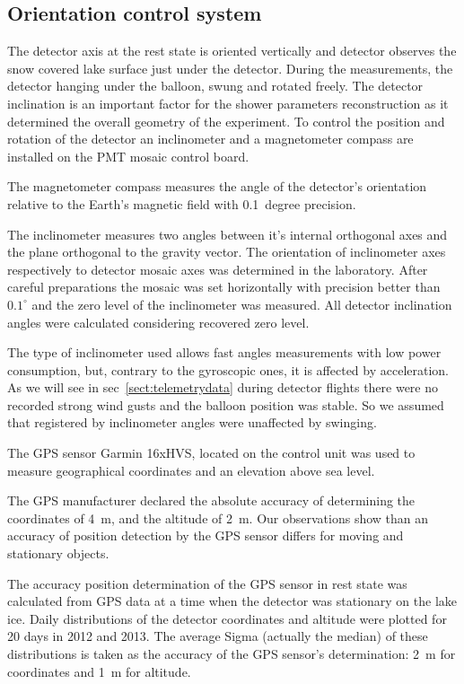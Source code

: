 \documentclass[final,5p,times,twocolumn]{elsarticle}
\begin{document}
\subsection{Orientation control system}
\label{sect:orientation}

The detector axis at the rest state is oriented vertically and detector observes the snow covered lake surface just under the detector. During the measurements, the detector hanging under the balloon, swung and rotated freely. The detector inclination is an important factor for the shower parameters reconstruction as it determined the overall geometry of the experiment. To control the position and rotation of the detector an inclinometer and a magnetometer compass are installed on the PMT mosaic control board. 

The magnetometer compass measures the angle of the detector's orientation relative to the Earth's magnetic field with 0.1~degree precision.

The inclinometer measures two angles between it's internal orthogonal axes and the plane orthogonal to the gravity vector. The orientation of inclinometer axes respectively to detector mosaic axes was determined in the laboratory. After careful preparations the mosaic was set horizontally with precision better than $0.1^\circ$ and the zero level of the inclinometer was measured. All detector inclination angles were calculated considering recovered zero level.

The type of inclinometer used allows fast angles measurements with low power consumption, but, contrary to the gyroscopic ones, it is affected by acceleration. As we will see in sec~\ref{sect:telemetrydata} during detector flights there were no recorded strong wind gusts and the balloon position was stable. So we assumed that  registered by inclinometer angles were unaffected by swinging.

The GPS sensor Garmin 16xHVS, located on the control unit was used to measure geographical coordinates and an elevation above sea level. 

The GPS manufacturer declared the absolute accuracy of determining the coordinates of 4~m, and the altitude of 2~m. Our observations show than an accuracy of position detection by the GPS sensor differs for moving and stationary objects. 

The accuracy position determination of the GPS sensor in rest state was calculated from GPS data at a time when the detector was stationary on the lake ice. Daily distributions of the detector coordinates and altitude were plotted for 20 days in 2012 and 2013. The average Sigma (actually the median) of these distributions is taken as the accuracy of the GPS sensor's determination: 2~m for coordinates and 1~m for altitude.
\end{document}
